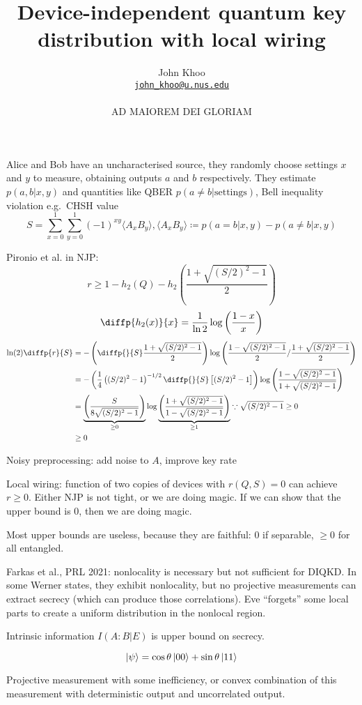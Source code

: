 \documentclass[10pt, a4paper]{article}
\title{Device-independent quantum key distribution with local wiring}
\author{John Khoo\\ \href{mailto:john_khoo@u.nus.edu}{\texttt{john\_khoo@u.nus.edu}} \\\\ AD MAIOREM DEI GLORIAM}
\newcommand{\?}{\mathrel{?}} %
\numberwithin{equation}{section} %
\theoremstyle{definition}
\theoremstyle{plain}
\theoremstyle{plain}
\begin{document}
  Alice and Bob have an uncharacterised source, they randomly choose settings \(x\) and \(y\) to measure, obtaining outputs \(a\) and \(b\) respectively. They estimate \(p(a,b|x,y)\) and quantities like QBER \(p(a \neq b|\text{settings})\), Bell inequality violation e.g.\ CHSH value
  \[ S = \sum_{x=0}^1 \sum_{y=0}^1 {(-1)}^{xy} \langle A_x B_y \rangle, \langle A_x B_y \rangle \coloneqq p(a=b|x,y) - p(a\neq b|x,y) \]

  Pironio et al. in NJP:
  \[ r \geq 1 - h_2(Q) - h_2\left( \frac{1 + \sqrt{(S/2)^2-1}}{2} \right) \]
  \[ \diffp{{h_2(x)}}{x} = \frac{1}{\ln 2} \log \left(\frac{1-x}{x}\right) \]
  \begin{align*}
    \ln (2) \diffp{r}{S} &= - \left( \diffp{}{S} \frac{1 + \sqrt{(S/2)^2-1}}{2} \right) \log \left( \frac{1 - \sqrt{(S/2)^2-1}}{2} / \frac{1 + \sqrt{(S/2)^2-1}}{2} \right) \\
                 &= - \left( \frac{1}{4} \left( (S/2)^2-1 \right)^{-1/2} \diffp{}{S} \left[ (S/2)^2-1 \right] \right) \log \left( \frac{1 - \sqrt{(S/2)^2-1}}{1 + \sqrt{(S/2)^2-1}} \right) \\
                 &= \underbrace{\left( \frac{S}{ 8\sqrt{(S/2)^2-1} } \right)}_{\geq 0} \log \underbrace{ \left( \frac{1 + \sqrt{(S/2)^2-1}}{1 - \sqrt{(S/2)^2-1}} \right) }_{\geq 1} \because \sqrt{(S/2)^2-1} \geq 0 \\
                 &\geq 0
  \end{align*}

  Noisy preprocessing: add noise to \(A\), improve key rate

  Local wiring: function of two copies of devices with \(r(Q, S) = 0\) can achieve \(r \geq 0\). Either NJP is not tight, or we are doing magic. If we can show that the upper bound is 0, then we are doing magic.

  Most upper bounds are useless, because they are faithful: 0 if separable, \(\geq 0\) for all entangled.

  Farkas et al., PRL 2021: nonlocality is necessary but not sufficient for DIQKD\@. In some Werner states, they exhibit nonlocality, but no projective measurements can extract secrecy (which can produce those correlations). Eve ``forgets'' some local parts to create a uniform distribution in the nonlocal region.

  Intrinsic information \(I(A:B|E)\) is upper bound on secrecy.

  \[ \ket{\psi} = \cos \theta \ket{00} + \sin \theta \ket{11} \]

  Projective measurement with some inefficiency, or convex combination of this measurement with deterministic output and uncorrelated output.
\end{document}
